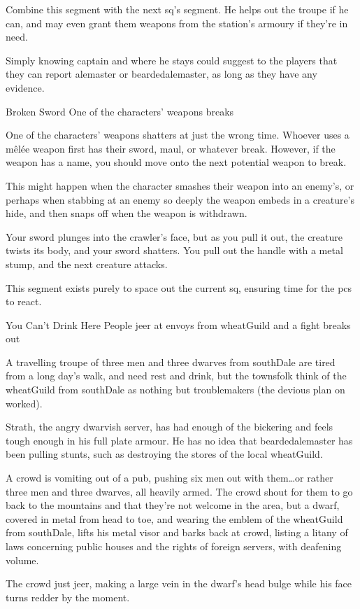 Combine this \gls{segment} with the next \gls{sq}'s \gls{segment}.
He helps out the troupe if he can, and may even grant them weapons from the station's armoury if they're in need.

\captain

Simply knowing \gls{captain} and where he stays could suggest to the players that they can report \gls{alemaster} or \gls{beardedalemaster}, as long as they have any evidence.

{\squash Broken Sword}%
{One of the characters' weapons breaks}%

One of the characters' weapons shatters at just the wrong time.
Whoever uses a m\^el\'ee weapon first has their sword, maul, or whatever break.
However, if the weapon has a name, you should move onto the next potential weapon to break.

This might happen when the character smashes their weapon into an enemy's, or perhaps when stabbing at an enemy so deeply the weapon embeds in a creature's hide, and then snaps off when the weapon is withdrawn.

\begin{boxtext}
  Your sword plunges into the \gls{crawler}'s face, but as you pull it out, the creature twists its body, and your sword shatters.
  You pull out the handle with a metal stump, and the next creature attacks.
\end{boxtext}

This \gls{segment} exists purely to space out the current \gls{sq}, ensuring time for the \glspl{pc} to react.

{You Can't Drink Here}%
{People jeer at envoys from  \gls{wheatGuild} and a fight breaks out}%

A travelling troupe of three men and three dwarves from \gls{southDale} are tired from a long day's walk, and need rest and drink, but the townsfolk think of the \gls{wheatGuild} from \gls{southDale} as nothing but troublemakers (the devious plan on  worked).

Strath, the angry dwarvish \gls{server}, has had enough of the bickering and feels tough enough in his full plate armour.
He has no idea that \gls{beardedalemaster} has been pulling stunts, such as destroying the stores of the local \gls{wheatGuild}.

\begin{boxtext}
  A crowd is vomiting out of a pub, pushing six men out with them\ldots or rather three men and three dwarves, all heavily armed.
  The crowd shout for them to go back to the mountains and that they're not welcome in the area, but a dwarf, covered in metal from head to toe, and wearing the emblem of the \gls{wheatGuild} from \gls{southDale}, lifts his metal visor and barks back at crowd, listing a litany of laws concerning public houses and the rights of foreign \glspl{server}, with deafening volume.

  The crowd just jeer, making a large vein in the dwarf's head bulge while his face turns redder by the moment.
\end{boxtext}

